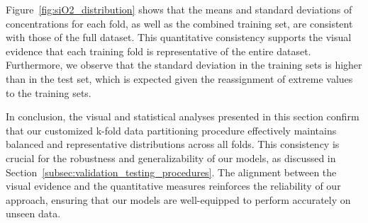 Figure~\ref{fig:siO2_distribution} shows that the means and standard deviations of  concentrations for each fold, as well as the combined training set, are consistent with those of the full dataset.
This quantitative consistency supports the visual evidence that each training fold is representative of the entire dataset.
Furthermore, we observe that the standard deviation in the training sets is higher than in the test set, which is expected given the reassignment of extreme values to the training sets.

In conclusion, the visual and statistical analyses presented in this section confirm that our customized k-fold data partitioning procedure effectively maintains balanced and representative distributions across all folds.
This consistency is crucial for the robustness and generalizability of our models, as discussed in Section~\ref{subsec:validation_testing_procedures}.
The alignment between the visual evidence and the quantitative measures reinforces the reliability of our approach, ensuring that our models are well-equipped to perform accurately on unseen data.